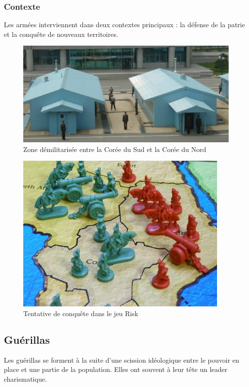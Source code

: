 \documentclass{article}
\begin{document}
\subsubsection{Contexte}
Les armées interviennent dans deux contextes principaux : la défense de la patrie et la conquête de nouveaux territoires.
\begin{figure}[H]
	\begin{centering}
	\includegraphics[width=\linewidth]{../ressources/dmz-corea}
	\caption{Zone démilitarisée entre la Corée du Sud et la Corée du Nord \cite{dmz_corea}}
	\end{centering}
\end{figure}
\begin{figure}[H]
	\begin{centering}
	\includegraphics[scale=0.8]{../ressources/risk-board-game}
	\caption{Tentative de conquête dans le jeu Risk \cite{risk_picture}}
	\end{centering}
\end{figure}




\subsection{Guérillas}
Les guérillas se forment à la suite d'une scission idéologique entre le pouvoir en place et une partie de la population. Elles ont souvent à leur tête un leader charismatique.
\end{document}
